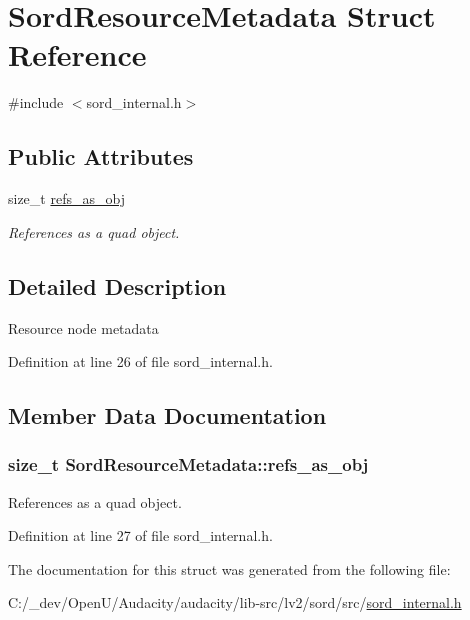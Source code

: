 \hypertarget{struct_sord_resource_metadata}{}\section{Sord\+Resource\+Metadata Struct Reference}
\label{struct_sord_resource_metadata}


{\ttfamily \#include $<$sord\+\_\+internal.\+h$>$}

\subsection*{Public Attributes}
\begin{DoxyCompactItemize}
\item 
size\+\_\+t \hyperlink{struct_sord_resource_metadata_aa71e76a7af2f084bbd003cd991d06577}{refs\+\_\+as\+\_\+obj}
\begin{DoxyCompactList}\small\item\em References as a quad object. \end{DoxyCompactList}\end{DoxyCompactItemize}


\subsection{Detailed Description}
Resource node metadata 

Definition at line 26 of file sord\+\_\+internal.\+h.



\subsection{Member Data Documentation}
\subsubsection[{\texorpdfstring{refs\+\_\+as\+\_\+obj}{refs_as_obj}}]{\setlength{\rightskip}{0pt plus 5cm}size\+\_\+t Sord\+Resource\+Metadata\+::refs\+\_\+as\+\_\+obj}\hypertarget{struct_sord_resource_metadata_aa71e76a7af2f084bbd003cd991d06577}{}\label{struct_sord_resource_metadata_aa71e76a7af2f084bbd003cd991d06577}


References as a quad object. 



Definition at line 27 of file sord\+\_\+internal.\+h.



The documentation for this struct was generated from the following file\+:\begin{DoxyCompactItemize}
\item 
C\+:/\+\_\+dev/\+Open\+U/\+Audacity/audacity/lib-\/src/lv2/sord/src/\hyperlink{sord__internal_8h}{sord\+\_\+internal.\+h}\end{DoxyCompactItemize}
